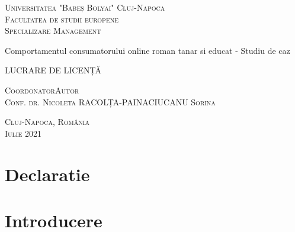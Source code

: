\documentclass[a4paper, 12pt]{article}
\begin{document}
\begin{titlepage}
	\begin{center}
		\vspace{0.5cm}
		\LARGE \textsc{Universitatea "Babeș Bolyai"}
		\LARGE \textsc{Cluj-Napoca}
		\\
		\vspace{0.5cm}
		\Large \textsc{Facultatea de studii europene}
		\\
		\Large \textsc{Specializare Management}
		
		
		\vspace{1.5cm}
		
		\Huge Comportamentul consumatorului online roman tanar si educat - Studiu de caz
		\\
		\bigskip
	

		\vspace{0.5cm}		
		\Large LUCRARE DE LICENȚĂ
		
		\vfill
		
		\Large
		\textsc{Coordonator}\hfill \textsc{Autor}
		\\
		\large
		\textsc{Conf. dr. Nicoleta RACOLȚA-PAINA}\hfill\textsc{CIUCANU Sorina}
		
		\vspace{1.5cm}
		\textsc{Cluj-Napoca, România}\\
		\textsc{Iulie 2021}
		
	\end{center}
\end{titlepage}
\restoregeometry

\tableofcontents

\newpage
\listoffigures

\newpage
\nocite{bobalcua2015loyal}
\nocite{london_economics_2011}
\nocite{duralia2016particularities}
\nocite{devderea2018consumer}
\nocite{armstrong2014principles}
\nocite{orzan2014study}
\nocite{obradattitudes}
\nocite{sava_2020}
\nocite{bighiu2015compulsive}
\nocite{gorunescu_2020}

\section*{Declaratie}
\newpage

\section*{Introducere}
	
\end{document}
